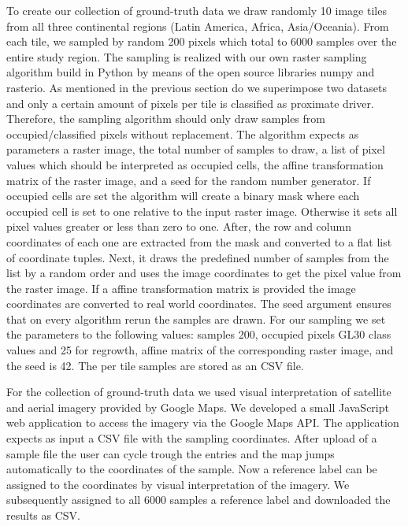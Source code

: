 			To create our collection of ground-truth data we draw randomly 10 image tiles from all three continental regions (Latin America, Africa, Asia/Oceania). From each tile, we sampled by random 200 pixels which total to 6000 samples over the entire study region. The sampling is realized with our own raster sampling algorithm build in Python by means of the open source libraries numpy and rasterio. As mentioned in the previous section do we superimpose two datasets and only a certain amount of pixels per tile is classified as proximate driver. Therefore, the sampling algorithm should only draw samples from occupied/classified pixels without replacement. The algorithm expects as parameters a raster image, the total number of samples to draw, a list of pixel values which should be interpreted as occupied cells, the affine transformation matrix of the raster image, and a seed for the random number generator. If occupied cells are set the algorithm will create a binary mask where each occupied cell is set to one relative to the input raster image. Otherwise it sets all pixel values greater or less than zero to one. After, the row and column coordinates of each one are extracted from the mask and converted to a flat list of coordinate tuples. Next, it draws the predefined number of samples from the list by a random order and uses the image coordinates to get the pixel value from the raster image. If a affine transformation matrix is provided the image coordinates are converted to real world coordinates. The seed argument ensures that on every algorithm rerun the samples are drawn. For our sampling we set the parameters to the following values: samples 200, occupied pixels \ac{GL30} class values and 25 for regrowth, affine matrix of the corresponding raster image, and the seed is 42. The per tile samples are stored as an \ac{CSV} file.

			For the collection of ground-truth data we used visual interpretation of satellite and aerial imagery provided by Google Maps. We developed a small JavaScript web application to access the imagery via the Google Maps \ac{API}. The application expects as input a \ac{CSV} file with the sampling coordinates. After upload of a sample file the user can cycle trough the entries and the map jumps automatically to the coordinates of the sample. Now a reference label can be assigned to the coordinates by visual interpretation of the imagery. We subsequently assigned to all 6000 samples a reference label and downloaded the results as \ac{CSV}.

